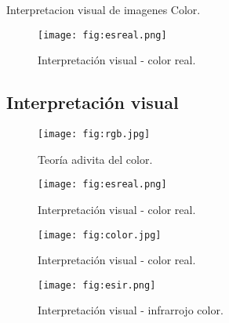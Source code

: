 \begin{frame}{}
    \begin{block}{Interpretacion visual de imagenes}
     Color.

    \end{block}
\end{frame}



\begin{frame}{}
  \begin{figure}
    \centering
    \texttt{[image: fig:esreal.png]}
    \caption{Interpretación visual - color real. }
    \label{}
  \end{figure}
\end{frame}



\subsection{Interpretación visual}

\begin{frame}{}
  \begin{figure}
    \centering
    \texttt{[image: fig:rgb.jpg]}
    \caption{Teoría adivita del color.}
    \label{}
  \end{figure}
\end{frame}


\begin{frame}{}
  \begin{figure}
    \centering
    \texttt{[image: fig:esreal.png]}
    \caption{Interpretación visual - color real. }
    \label{}
  \end{figure}
\end{frame}

\begin{frame}{}
  \begin{figure}
    \centering
    \texttt{[image: fig:color.jpg]}
    \caption{Interpretación visual - color real.}
    \label{}
  \end{figure}
\end{frame}
\begin{frame}{}
  \begin{figure}
    \centering
    \texttt{[image: fig:esir.png]}
    \caption{Interpretación visual - infrarrojo color.}
    \label{}
  \end{figure}
\end{frame}

